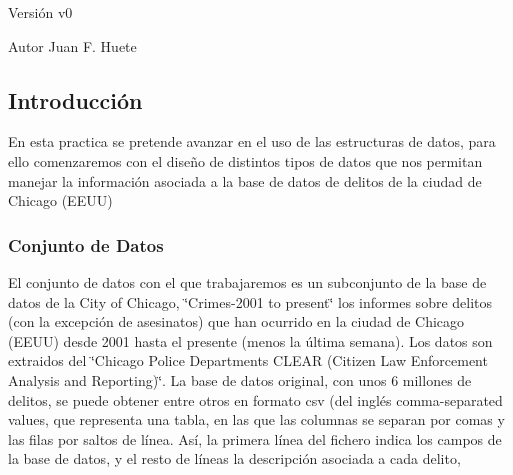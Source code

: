 \begin{DoxyVersion}{Versión}
v0 
\end{DoxyVersion}
\begin{DoxyAuthor}{Autor}
Juan F. Huete
\end{DoxyAuthor}
\hypertarget{index_introsec}{}\subsection{Introducción}\label{index_introsec}
En esta practica se pretende avanzar en el uso de las estructuras de datos, para ello comenzaremos con el diseño de distintos tipos de datos que nos permitan manejar la información asociada a la base de datos de delitos de la ciudad de Chicago (E\+E\+U\+U)\hypertarget{index_baseDatos}{}\subsubsection{Conjunto de Datos}\label{index_baseDatos}
El conjunto de datos con el que trabajaremos es un subconjunto de la base de datos de la City of Chicago, \char`\"{}\+Crimes-\/2001 to present\char`\"{} los informes sobre delitos (con la excepción de asesinatos) que han ocurrido en la ciudad de Chicago (E\+E\+U\+U) desde 2001 hasta el presente (menos la última semana). Los datos son extraidos del \char`\"{}\+Chicago Police Department\textquotesingle{}s C\+L\+E\+A\+R (\+Citizen Law Enforcement Analysis and Reporting)\char`\"{}. La base de datos original, con unos 6 millones de delitos, se puede obtener entre otros en formato csv (del inglés comma-\/separated values, que representa una tabla, en las que las columnas se separan por comas y las filas por saltos de línea. Así, la primera línea del fichero indica los campos de la base de datos, y el resto de líneas la descripción asociada a cada delito,


